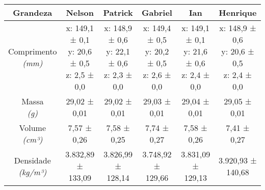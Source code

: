 \documentclass{article}
\begin{document}
\begin{table}[h!]
\centering
\begin{tabular}{c c c c c c }
\toprule
Grandeza & Nelson & Patrick & Gabriel & Ian & Henrique\\
\midrule
\shortstack{Comprimento\\\textit{(mm)}} & \shortstack{x: 149,1 ± 0,1\\y: 20,6 ± 0,5\\z: 2,5 ± 0,0} & \shortstack{x: 148,9 ± 0,6\\y: 22,1 ± 0,6\\z: 2,3 ± 0,0} & \shortstack{x: 149,4 ± 0,5\\y: 20,2 ± 0,5\\z: 2,6 ± 0,0} & \shortstack{x: 149,1 ± 0,1\\y: 21,6 ± 0,6\\z: 2,4 ± 0,0} & \shortstack{x: 148,9 ± 0,6\\y: 20,6 ± 0,5\\z: 2,4 ± 0,0}\\[4pt]
\shortstack{Massa\\\textit{(g)}} & 29,02 ± 0,01 & 29,02 ± 0,01 & 29,03 ± 0,01 & 29,04 ± 0,01 & 29,05 ± 0,01\\[4pt]
\shortstack{Volume\\\textit{(cm³)}} & 7,57 ± 0,26 & 7,58 ± 0,25 & 7,74 ± 0,27 & 7,58 ± 0,26 & 7,41 ± 0,27\\[4pt]
\shortstack{Densidade\\\textit{(kg/m³)}} & 3.832,89 ± 133,09 & 3.826,99 ± 128,14 & 3.748,92 ± 129,66 & 3.831,09 ± 129,13 & 3.920,93 ± 140,68\\[4pt]
\bottomrule
\end{tabular}
\end{table}
\end{document}
